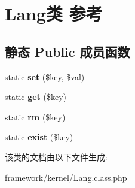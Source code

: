 \hypertarget{classLang}{\section{Lang类 参考}
\label{classLang}
}
\subsection*{静态 Public 成员函数}
\begin{DoxyCompactItemize}
\item 
\hypertarget{classLang_ab0a24dc7ac83d5f62a8166208f708ea8}{static {\bfseries set} (\$key, \$val)}\label{classLang_ab0a24dc7ac83d5f62a8166208f708ea8}

\item 
\hypertarget{classLang_afc8d224f696954465eb15d4e39f23cab}{static {\bfseries get} (\$key)}\label{classLang_afc8d224f696954465eb15d4e39f23cab}

\item 
\hypertarget{classLang_a5e5d7effc3bc72b426607b3cce71dba4}{static {\bfseries rm} (\$key)}\label{classLang_a5e5d7effc3bc72b426607b3cce71dba4}

\item 
\hypertarget{classLang_aefe22cfad951261b81cb1d6b767c31d2}{static {\bfseries exist} (\$key)}\label{classLang_aefe22cfad951261b81cb1d6b767c31d2}

\end{DoxyCompactItemize}


该类的文档由以下文件生成\+:\begin{DoxyCompactItemize}
\item 
framework/kernel/Lang.\+class.\+php\end{DoxyCompactItemize}
